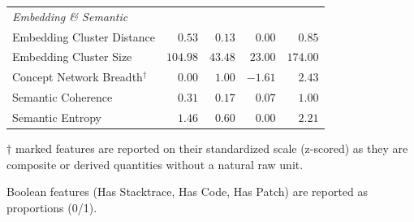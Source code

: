 \begin{table}[h]
\begin{tabular}{lrrrr}
    \midrule
    \multicolumn{5}{l}{\textit{Embedding \& Semantic}} \\
    Embedding Cluster Distance          & $0.53$ & $0.13$ & $0.00$ & $0.85$ \\
    Embedding Cluster Size              & $104.98$ & $43.48$ & $23.00$ & $174.00$ \\
    Concept Network Breadth$^\dagger$   & $0.00$ & $1.00$ & $-1.61$ & $2.43$ \\
    Semantic Coherence                  & $0.31$ & $0.17$ & $0.07$ & $1.00$ \\
    Semantic Entropy                    & $1.46$ & $0.60$ & $0.00$ & $2.21$ \\
    
    \bottomrule
    \end{tabular}
    \begin{tablenotes}
        \item $\dagger$ marked features are reported on their standardized scale (z-scored) as they are composite or derived quantities without a natural raw unit. 
        \item Boolean features (Has Stacktrace, Has Code, Has Patch) are reported as proportions (0/1).
    \end{tablenotes}
    \end{table}